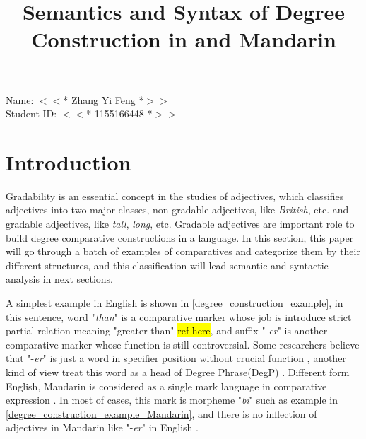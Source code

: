 \documentclass{ctexart}
\title{Semantics and Syntax of Degree Construction in and Mandarin}
\date{\vspace{-10ex}}
\let \cite \parencite
\begin{document}
\thispagestyle{empty} %

\begin{center}

Name: $<<$* Zhang Yi Feng *$>>$ \\
Student ID: $<<$* 1155166448 *$>>$

\end{center}

{\let\newpage\relax\maketitle}


\section{Introduction}

\setcounter{page}{1}

Gradability is an essential concept in the studies of adjectives, which classifies adjectives into two major classes, non-gradable adjectives, like \textit{British}, etc. and gradable adjectives, like \textit{tall}, \textit{long}, etc. Gradable adjectives are important role to build degree comparative constructions in a language. In this section, this paper will go through a batch of examples of comparatives and categorize them by their different structures, and this classification will lead semantic and syntactic analysis in next sections. 

A simplest example in English is shown in \ref{degree_construction_example}, in this sentence, word "\textit{than}" is a comparative marker whose job is introduce strict partial relation meaning "greater than" \hl{ref here}, and suffix "-\textit{er}" is another comparative marker whose function is still controversial. Some researchers believe that "-\textit{er}" is just a word in specifier position without crucial function \cite{von1984a,heim1985,bhatt2004,rullmann1995}, another kind of view treat this word as a head of Degree Phrase(DegP) \cite{bierwisch1989,corver1990,corver1993,corver1997a,kennedy1997,grano2012}. Different form English, Mandarin is considered as a single mark language in comparative expression \cite{bobaljik2012,grano2012}. In most of cases, this mark is morpheme "\textit{bi}" such as example in \ref{degree_construction_example_Mandarin}, and there is no inflection of adjectives in Mandarin like "-\textit{er}" in English \cite{guo2012}. 
\end{document}
